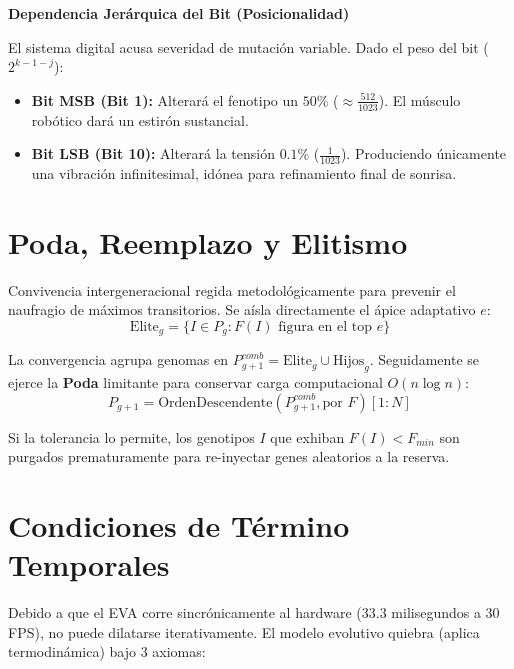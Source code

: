 \documentclass[11pt, a4paper]{article}
\begin{document}
\begin{highlightbox}
\textbf{Dependencia Jerárquica del Bit (Posicionalidad)}

El sistema digital acusa severidad de mutación variable. Dado el peso del bit ($2^{k-1-j}$):
\begin{itemize}
    \vspace{-0.2cm}\itemsep0em
    \item \textbf{Bit MSB (Bit 1):} Alterará el fenotipo un $50\%$ ($\approx \frac{512}{1023}$). El músculo robótico dará un estirón sustancial.
    \item \textbf{Bit LSB (Bit 10):} Alterará la tensión $0.1\%$ ($\frac{1}{1023}$). Produciendo únicamente una vibración infinitesimal, idónea para refinamiento final de sonrisa.
\end{itemize}
\end{highlightbox}


\section{Poda, Reemplazo y Elitismo}

Convivencia intergeneracional regida metodológicamente para prevenir el naufragio de máximos transitorios.
Se aísla directamente el ápice adaptativo $e$:
\begin{equation}
\text{Elite}_g = \{I \in P_g : F(I) \text{ figura en el top } e\}
\end{equation}

La convergencia agrupa genomas en $P_{g+1}^{comb} = \text{Elite}_g \cup \text{Hijos}_g$. Seguidamente se ejerce la \textbf{Poda} limitante para conservar carga computacional $O(n \log n)$:
\begin{equation}
P_{g+1} = \text{OrdenDescendente}(P_{g+1}^{comb}, \text{por } F) [1:N]
\end{equation}

Si la tolerancia lo permite, los genotipos $I$ que exhiban $F(I) < F_{min}$ son purgados prematuramente para re-inyectar genes aleatorios a la reserva.


\section{Condiciones de Término Temporales}

Debido a que el EVA corre sincrónicamente al hardware ($33.3$ milisegundos a $30$ FPS), no puede dilatarse iterativamente.
El modelo evolutivo quiebra (aplica termodinámica) bajo 3 axiomas:
\end{document}
